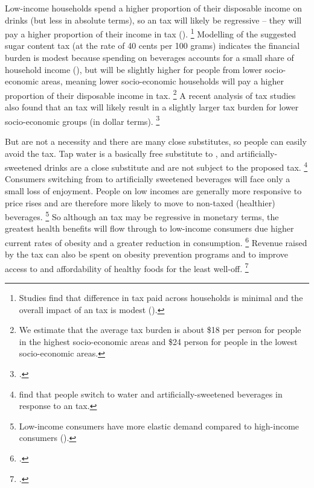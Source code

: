 \documentclass[embargoed]{grattan}
\begin{document}
Low-income households spend a higher proportion of their disposable income on drinks (but less in absolute terms), so an \SSB{} tax will likely be regressive -- they will pay a higher proportion of their income in tax ().%
\footnote{Studies find that difference in tax paid across households is minimal and the overall impact of an \SSB{} tax is modest (\textcites{Backholer2014effectsugarsweetened}{Etile2015DoHighConsumers}).} Modelling of the suggested sugar content tax (at the rate of 40 cents per 100 grams) indicates the financial burden is modest because spending on beverages accounts for a small share of household income (), but will be slightly higher for people from lower socio-economic areas, meaning lower socio-economic households will pay a higher proportion of their disposable income in tax.%
\footnote{We estimate that the average tax burden is about \$18 per person for people in the highest socio-economic areas and \$24 person for people in the lowest socio-economic areas.} A recent analysis of \SSB{} tax studies also found that an \SSB{} tax will likely result in a slightly larger tax burden for lower socio-economic groups (in dollar terms).%
\footcite{Backholer2016impacttaxsugar}

But \SSBs{} are not a necessity and there are many close substitutes, so people can easily avoid the tax.
Tap water is a basically free substitute to \SSBs{}, and artificially-sweetened drinks are a close substitute and are not subject to the proposed tax.%
\footnote{\textcites{Briggs2013Overallincomespecific}{Colchero2016Beveragepurchasesstores}{Sharma2014effectstaxingsugarsweetened}{Zhen2014Predictingeffectssugar} find that people switch to water and artificially-sweetened beverages in response to an \SSB{} tax.}
Consumers switching from \SSBs{} to artificially sweetened beverages will face only a small loss of enjoyment.
People on low incomes are generally more responsive to price rises and are therefore more likely to move to non-taxed (healthier) beverages.%
\footnote{Low-income consumers have more elastic demand compared to high-income consumers (\textcites{Yang2016child}{Colchero2016Beveragepurchasesstores}{Etile2015DoHighConsumers}{Briggs2013Overallincomespecific}).} So although an \SSB{} tax may be regressive in monetary terms, the greatest health benefits will flow through to low-income consumers due higher current rates of obesity and a greater reduction in consumption.%
\footcites{Coalition2016Policybriefcase}{Organization2016FiscalPoliciesDiet}{Backholer2016impacttaxsugar} Revenue raised by the tax can also be spent on obesity prevention programs and to improve access to and affordability of healthy foods for the least well-off.%
\footcites{Wetter2016TaxingSugarSweetened}{Organization2016FiscalPoliciesDiet}
\end{document}
